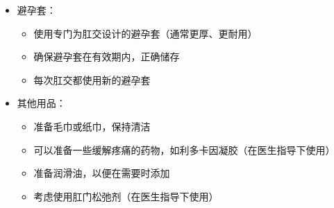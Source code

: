 \documentclass[12pt,UTF8]{ctexbook}
\begin{document}
\begin{itemize}
\begin{itemize}
\begin{itemize}
			\item 避免使用油基润滑剂（如凡士林、婴儿油），因为它们会损坏避孕套并增加感染风险
			\item 如果有过敏史，选择无香料、无添加剂的润滑剂
		\end{itemize}
		\item 避孕套：
		\begin{itemize}
			\item 使用专门为肛交设计的避孕套（通常更厚、更耐用）
			\item 确保避孕套在有效期内，正确储存
			\item 每次肛交都使用新的避孕套
		\end{itemize}
		\item 其他用品：
		\begin{itemize}
			\item 准备毛巾或纸巾，保持清洁
			\item 可以准备一些缓解疼痛的药物，如利多卡因凝胶（在医生指导下使用）
			\item 准备润滑油，以便在需要时添加
			\item 考虑使用肛门松弛剂（在医生指导下使用）
		\end{itemize}
	\end{itemize}
\end{itemize}
\end{document}
